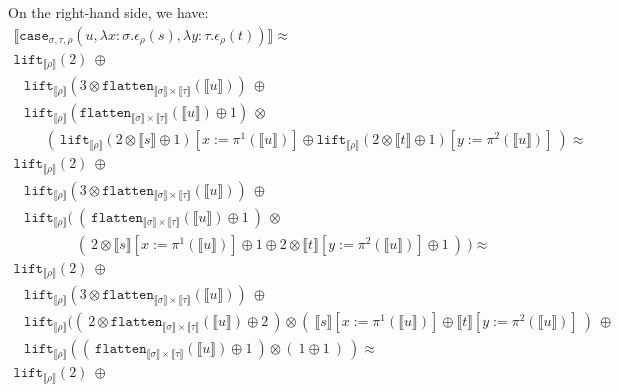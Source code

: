 \documentclass[runningheads,a4paper]{llncs}
\newcommand{\typeinterpret}[1]{\llbracket #1 \rrbracket}
\newcommand{\interpret}[1]{\llbracket #1 \rrbracket}
\newcommand{\abs}[2]{\lambda #1.#2}
\newcommand{\flatten}{\mathtt{flatten}}
\newcommand{\lift}{\mathtt{lift}}
\begin{document}
\begin{itemize}
  On the right-hand side, we have:
  \[
  \begin{array}{l}
  \interpret{\mathtt{case}_{\sigma,\tau,\rho}(u,
  \abs{x:\sigma}{\epsilon_\rho(s)},\abs{y:\tau}{\epsilon_\rho(t)})}
  \approx \\
  \lift_{\typeinterpret{\rho}}(2)\ \oplus \\
  \phantom{A}
  \lift_{\typeinterpret{\rho}}(3 \otimes \flatten_{\typeinterpret{
    \sigma} \times \typeinterpret{\tau}}(\interpret{u}))\ \oplus \\
  \phantom{A}
  \lift_{\typeinterpret{\rho}}(\flatten_{\typeinterpret{\sigma} \times
    \typeinterpret{\tau}}(\interpret{u}) \oplus 1)\ \otimes \\
  \phantom{ABC}
    (\ \lift_{\typeinterpret{\rho}}(2 \otimes \interpret{s} \oplus 1)
      [x:=\pi^1(\interpret{u})]
      \oplus
     \lift_{\typeinterpret{\rho}}(2 \otimes \interpret{t} \oplus 1)
      [y:=\pi^2(\interpret{u})]
    \ ) \approx \\
  \lift_{\typeinterpret{\rho}}(2)\ \oplus \\
  \phantom{A}
  \lift_{\typeinterpret{\rho}}(3 \otimes \flatten_{\typeinterpret{
    \sigma} \times \typeinterpret{\tau}}(\interpret{u}))\ \oplus \\
  \phantom{A}
  \lift_{\typeinterpret{\rho}}(\ (\ \flatten_{\typeinterpret{\sigma} \times
    \typeinterpret{\tau}}(\interpret{u}) \oplus 1\ )\ \otimes \\
  \phantom{ABCDEF}
    (\ 2 \otimes \interpret{s}[x:=\pi^1(\interpret{u})] \oplus 1
       \oplus
       2 \otimes \interpret{t}[y:=\pi^2(\interpret{u})] \oplus 1
    \ )\ ) \approx \\
  \lift_{\typeinterpret{\rho}}(2)\ \oplus \\
  \phantom{A}
  \lift_{\typeinterpret{\rho}}(3 \otimes \flatten_{\typeinterpret{
    \sigma} \times \typeinterpret{\tau}}(\interpret{u}))\ \oplus \\
  \phantom{A}
  \lift_{\typeinterpret{\rho}}((\ 2 \otimes \flatten_{\typeinterpret{
    \sigma} \times \typeinterpret{\tau}}(\interpret{u}) \oplus 2\ )
    \otimes (\ \interpret{s}[x:=\pi^1(\interpret{u})] \oplus
    \interpret{t}[y:=\pi^2(\interpret{u})]\ )\ \oplus \\
  \phantom{A}
  \lift_{\typeinterpret{\rho}}((\ \flatten_{\typeinterpret{\sigma} \times
    \typeinterpret{\tau}}(\interpret{u}) \oplus 1\ ) \otimes 
    (\ 1 \oplus 1\ )\ ) \approx \\
  \lift_{\typeinterpret{\rho}}(2)\ \oplus \\

\end{array}\]
\end{itemize}
\end{document}
